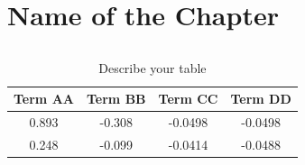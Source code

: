 %
%
\chapter{Name of the Chapter}
\label{chap:02}
\setlength{\parskip}{1em}
%

\section{}
\begin{center}
    \begin{table}[h]
    \captionsetup{belowskip=-25pt}  %
    \small
        \centering
        \begin{tabular}{|cccc|}
             Term AA & Term BB & Term CC & Term DD  \\
             \hline
                0.893 & -0.308 & -0.0498 & -0.0498 \\
                0.248 & -0.099 & -0.0414 & -0.0488 \\
        \end{tabular}
        \caption{Describe your table}
        \label{tab:1}
    \end{table}
\end{center}
%


